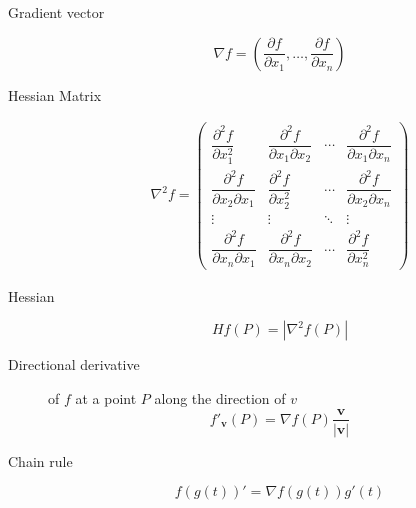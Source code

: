 \begin{multicols}{2}
	\begin{tcolorbox}[hbox, title=Partial derivatives]
		\begin{minipage}{0.4\textwidth}
			\flushleft
			\begin{description}
				\item[Gradient vector]
				\[
          \nabla f = \left(\frac{\partial f}{\partial x_1},\ldots, \frac{\partial f}{\partial x_n}\right)
        \]
				\item[Hessian Matrix]
				\[
          \begin{array}{c}
          \nabla^2f=
          \left(
          \begin{array}{cccc}
          \dfrac{\partial^2 f}{\partial x_1^2} & 
          \dfrac{\partial^2 f}{\partial x_1 \partial x_2} &
          \cdots &
          \dfrac{\partial^2 f}{\partial x_1 \partial x_n}\\
          \dfrac{\partial^2 f}{\partial x_2 \partial x_1} &
          \dfrac{\partial^2 f}{\partial x_2^2} & 
          \cdots &
          \dfrac{\partial^2 f}{\partial x_2 \partial x_n}\\
          \vdots & \vdots & \ddots & \vdots \\
          \dfrac{\partial^2 f}{\partial x_n \partial x_1} &
          \dfrac{\partial^2 f}{\partial x_n \partial x_2} &
          \cdots &
          \dfrac{\partial^2 f}{\partial x_n^2}
          \end{array}
          \right)
          \end{array}
        \]
				\item[Hessian] 
				\[
				  Hf(P)=|\nabla^2f(P)|
				\]
				\item[Directional derivative] of $f$ at a point $P$ along the direction of $v$
				\[
					f'_{\mathbf{v}}(P) = \nabla f(P)\frac{\mathbf{v}}{|\mathbf{v}|}
        \]
        \item[Chain rule] 
        \[
          f(g(t))' = \nabla f(g(t))g'(t)
        \]
			\end{description}
		\end{minipage}
	\end{tcolorbox}


\end{multicols}

